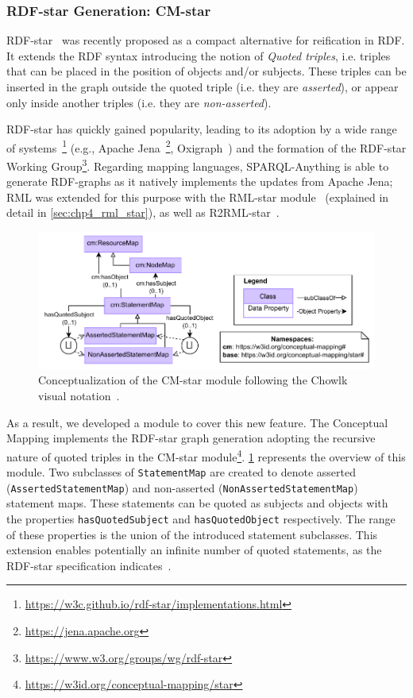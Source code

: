 \subsubsection{RDF-star Generation: CM-star}
\label{sec:chp4_cm-star}
RDF-star~\parencite{hartig2017foundations} was recently proposed as a compact alternative for reification in RDF. It extends the RDF syntax introducing the notion of \textit{Quoted triples}, i.e. triples that can be placed in the position of objects and/or subjects. These triples can be inserted in the graph outside the quoted triple (i.e. they are \textit{asserted}), or appear only inside another triples (i.e. they are \textit{non-asserted}).

RDF-star has quickly gained popularity, leading
to its adoption by a wide range of systems~\footnote{\url{https://w3c.github.io/rdf-star/implementations.html}} (e.g., Apache Jena~\footnote{\url{https://jena.apache.org}}, Oxigraph~\parencite{oxigraph}) and the formation of the RDF-star Working Group\footnote{\url{https://www.w3.org/groups/wg/rdf-star}}. 
Regarding mapping languages, SPARQL-Anything is able to generate RDF-graphs as it natively implements the updates from Apache Jena; RML was extended for this purpose with the RML-star module~\parencite{iglesias2022rmlstar,delva2021rml-star,iglesias2023rml} (explained in detail in \cref{sec:chp4_rml_star}), as well as R2RML-star~\parencite{sundqvist2022extending}.

\begin{figure}[!t]
\centering
\includegraphics[width=0.9\linewidth]{figures/chp4-2_cm-star.pdf}
\caption[CM-star module]{Conceptualization of the CM-star module following the Chowlk visual notation~\parencite{feria2022chowlk}.}
\label{fig:chp4-2_cm-star}
\end{figure}




As a result, we developed a module to cover this new feature. The Conceptual Mapping implements the RDF-star graph generation adopting the recursive nature of quoted triples in the CM-star module\footnote{\url{https://w3id.org/conceptual-mapping/star}}. \cref{fig:chp4-2_cm-star} represents the overview of this module. Two subclasses of \texttt{StatementMap} are created to denote asserted (\texttt{AssertedStatementMap}) and non-asserted (\texttt{NonAssertedStatementMap}) statement maps. These statements can be quoted as subjects and objects with the properties \texttt{hasQuotedSubject} and \texttt{hasQuotedObject} respectively. The range of these properties is the union of the introduced statement subclasses. This extension enables potentially an infinite number of quoted statements, as the RDF-star specification indicates~\parencite{hartig2023rdf}. 



